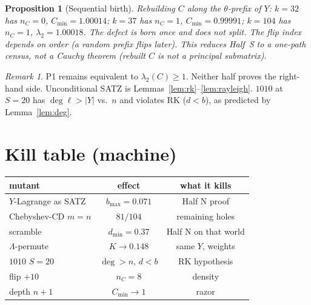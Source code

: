 \documentclass[11pt]{article}
\newtheorem{prop}{Proposition}
\theoremstyle{remark}
\newtheorem{remark}{Remark}
\begin{document}
\begin{prop}[Sequential birth]\label{prop:seq}
Rebuilding $C$ along the $\theta$-prefix of $Y$:
$k=32$ has $n_C=0$, $C_{\min}=1.00014$;
$k=37$ has $n_C=1$, $C_{\min}=0.99991$;
$k=104$ has $n_C=1$, $\lambda_2=1.00018$.
The defect is born once and does not split.
The flip index depends on order (a random prefix flips
later).  This reduces Half~S to a one-path census, not a
Cauchy theorem (rebuilt $C$ is not a principal submatrix).
\end{prop}

\begin{remark}
P1 remains equivalent to $\lambda_2(C)\ge 1$.
Neither half proves the right-hand side.
Unconditional SATZ is Lemmas~\ref{lem:rk}--\ref{lem:rayleigh}.
$1010$ at $S=20$ has $\deg\ell>|Y|$ vs.\ $n$ and violates
RK ($d<b$), as predicted by Lemma~\ref{lem:deg}.
\end{remark}

\section*{Kill table (machine)}

\begin{center}
\begin{tabular}{@{}lcc@{}}
\toprule
mutant & effect & what it kills \\
\midrule
$Y$-Lagrange as SATZ & $b_{\max}=0.071$ & Half N proof \\
Chebyshev-CD $m=n$ & $81/104$ & remaining holes \\
scramble & $d_{\min}=0.37$ & Half N on that world \\
$\Lambda$-permute & $K\to 0.148$ & same $Y$, weights \\
$1010$ $S=20$ & $\deg>n$, $d<b$ & RK hypothesis \\
flip $+10$ & $n_C=8$ & density \\
depth $n+1$ & $C_{\min}\to 1$ & razor \\
\bottomrule
\end{tabular}
\end{center}
\end{document}
